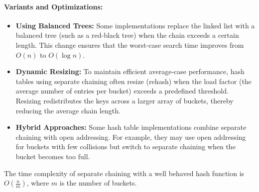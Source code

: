 \paragraph{Variants and Optimizations:}
\begin{itemize}
    \item \textbf{Using Balanced Trees:} Some implementations replace the linked list with a balanced tree (such as a red-black tree) when the chain exceeds a certain length. This change ensures that the worst-case search time improves from \(O(n)\) to \(O(\log n)\).
    \item \textbf{Dynamic Resizing:} To maintain efficient average-case performance, hash tables using separate chaining often resize (rehash) when the load factor (the average number of entries per bucket) exceeds a predefined threshold. Resizing redistributes the keys across a larger array of buckets, thereby reducing the average chain length.
    \item \textbf{Hybrid Approaches:} Some hash table implementations combine separate chaining with open addressing. For example, they may use open addressing for buckets with few collisions but switch to separate chaining when the bucket becomes too full.
\end{itemize}

The time complexity of separate chaining with a well behaved hash function is $O(\frac{n}{m})$, where $m$ is the 
number of buckets. 